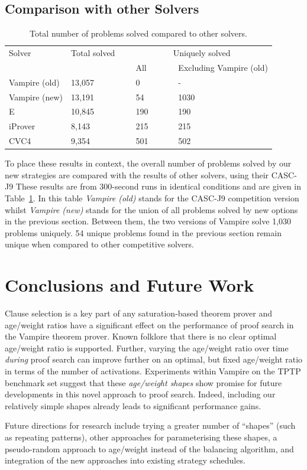 \documentclass{llncs}
\begin{document}
\subsection{Comparison with other Solvers}

\begin{table}[t]
	\caption{
Total number of problems solved compared to other solvers.
}
	\centering
	\begin{tabular}{l l l l}
	Solver~~ & Total solved~~~ & \multicolumn{2}{c}{Uniquely solved}  \\
	& & All ~~~~~& Excluding Vampire (old) \\
	\hline
	Vampire (old)	& 13,057 & 0 & -\\
	Vampire (new)   & 13,191 & 54 & 1030\\
	E 		& 10,845 & 190 & 190\\
	iProver		& 8,143 & 215 & 215\\
	CVC4		& 9,354 & 501 & 502\\
	\end{tabular}
	\label{tab:other}
\end{table}

To place these results in context, the overall number of problems solved by our new strategies are compared with the results of other solvers, using their CASC-J9
These results are from 300-second runs in identical conditions and are given in Table~\ref{tab:other}.
In this table \emph{Vampire (old)} stands for the CASC-J9 competition version whilst \emph{Vampire (new)} stands for the union of all problems solved by new options in the previous section.
Between them, the two versions of Vampire solve 1,030 problems uniquely.
54 unique problems found in the previous section remain unique when compared to other competitive solvers.

\section{Conclusions and Future Work}
\label{sec:conclusions}

Clause selection is a key part of any saturation-based theorem prover and age/weight ratios have a significant effect on the performance of proof search in the Vampire theorem prover.
Known folklore that there is no clear optimal age/weight ratio is supported.
Further, varying the age/weight ratio over time \emph{during} proof search can improve further on an optimal, but fixed age/weight ratio in terms of the number of activations.
Experiments within Vampire on the TPTP benchmark set suggest that these \emph{age/weight shapes} show promise for future developments in this novel approach to proof search. Indeed, including our relatively simple shapes already leads to significant performance gains.

Future directions for research include trying a greater number of ``shapes'' (such as repeating patterns), other approaches for parameterising these shapes, a pseudo-random approach to age/weight instead of the balancing algorithm, and integration of the new approaches into existing strategy schedules.


\end{document}
